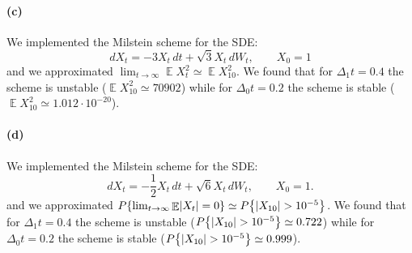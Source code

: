 \documentclass[a4paper,11pt]{article}
\theoremstyle{definition}
\theoremstyle{plain}
\theoremstyle{remark}
\DeclarePairedDelimiter{\abs}{\lvert}{\rvert}
\DeclarePairedDelimiter{\bra}{\lbrace}{\rbrace}
\DeclareMathOperator*{\expval}{\mathbb{E}}
\begin{document}
\paragraph*{(c)}

We implemented the Milstein scheme for the SDE:
\begin{equation}\label{eq:mean_square}
dX_t = -3X_t\,dt + \sqrt{3}X_t\,dW_t, \qquad X_0 = 1
\end{equation}
and we approximated $\lim_{t\to\infty}\expval X_t^2\simeq\expval X_{10}^2$. We found that for $\Delta_1 t = 0.4$ the scheme is unstable ($\expval X_{10}^2\simeq70902$) while for $\Delta_0 t = 0.2$ the scheme is stable ($\expval X_{10}^2\simeq1.012\cdot10^{-20}$).

\paragraph*{(d)}

We implemented the Milstein scheme for the SDE:
\begin{equation}\label{eq:prob}
dX_t = -\frac{1}{2}X_t\,dt + \sqrt{6}X_t\,dW_t, \qquad X_0 = 1.
\end{equation}
and we approximated $P\bra*{\lim_{t\to\infty}\expval \abs{X_t}=0}\simeq P\bra*{\abs{X_{10}}>10^{-5}}$. We found that for $\Delta_1 t = 0.4$ the scheme is unstable ($ P\bra*{\abs{X_{10}}>10^{-5}}\simeq0.722$) while for $\Delta_0 t = 0.2$ the scheme is stable ($P\bra*{\abs{X_{10}}>10^{-5}}\simeq0.999$).
\end{document}

